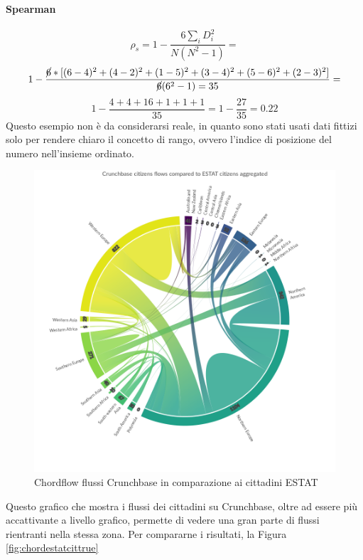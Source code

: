 \paragraph{Spearman}
\[\rho _{s}=1-{\frac {6\sum _{i}D_{i}^{2}}{N(N^{2}-1)}} =\]
\[1 - \frac{\cancel{6}*[(6-4)^2+(4-2)^2+(1-5)^2+(3-4)^2+(5-6)^2+(2-3)^2]}{\cancel{6}(6^2-1)=35} =\]
\[1 - \frac{4+4+16+1+1+1}{35} = 1 - \frac{27}{35} = 0.22\]
Questo esempio non è da considerarsi reale, in quanto sono stati usati dati fittizi solo per rendere chiaro il concetto di rango, ovvero l'indice di posizione del numero nell'insieme ordinato.






\begin{figure}[t]
    \centering
    \includegraphics[width=1.0\textwidth]{images/ChordFlows/Crunchbase_cit_ESTAT_True.png}
    \caption{Chordflow flussi Crunchbase in comparazione ai cittadini ESTAT}
    \label{fig:chordcrunchestatcittrue}
\end{figure}
Questo grafico che %
mostra i flussi dei cittadini su Crunchbase, oltre ad essere più accattivante a livello grafico, permette di vedere una gran parte di flussi rientranti nella stessa zona. Per compararne i risultati, %
la Figura \ref{fig:chordestatcittrue} %
